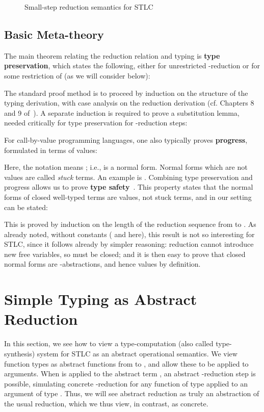\documentclass{LMCS}
\begin{document}
\begin{figure}

\caption{Small-step reduction semantics for STLC}
\label{fig:stlcopsem}
\end{figure}

\subsection{Basic Meta-theory}
\label{sec:basicmeta}

The main theorem relating the reduction relation  and typing is
\textbf{type preservation}, which states the following, either for
unrestricted -reduction  or for some restriction of 
(as we will consider below):


\noindent The standard proof method is to proceed by induction on the
structure of the typing derivation, with case analysis on the
reduction derivation (cf. Chapters 8 and 9 of~\cite{pierce02}).  A separate
induction is required to prove a substitution lemma, needed critically
for type preservation for -reduction steps:


\noindent For call-by-value programming languages, one also typically
proves \textbf{progress}, formulated in terms of values:

\noindent Here, the notation  means ; i.e.,  is a normal form.  Normal forms
which are not values are called \emph{stuck} terms.  An example is
.  Combining type preservation and progress allows us to
prove \textbf{type safety}~\cite{wright+94}.  This property states
that the normal forms of closed well-typed terms are values, not stuck
terms, and in our setting can be stated:

\noindent This is proved by induction on the length of the reduction
sequence from  to .  As already noted, without constants (
and  here), this result is not so interesting for STLC, since it
follows already by simpler reasoning: reduction cannot introduce new
free variables, so  must be closed; and it is then easy to prove
that closed normal forms are -abstractions, and hence values
by definition.

\section{Simple Typing as Abstract Reduction}
\label{sec:restlc}

In this section, we see how to view a type-computation (also called
type-synthesis) system for STLC as an abstract operational semantics.
We view function types  as abstract functions from 
to , and allow these to be applied to arguments.  When  is applied to the abstract term , an abstract
-reduction step is possible, simulating concrete
-reduction for any function of type  applied to an
argument of type .  Thus, we will see abstract reduction as truly
an abstraction of the usual reduction, which we thus view, in
contrast, as concrete.
\end{document}
